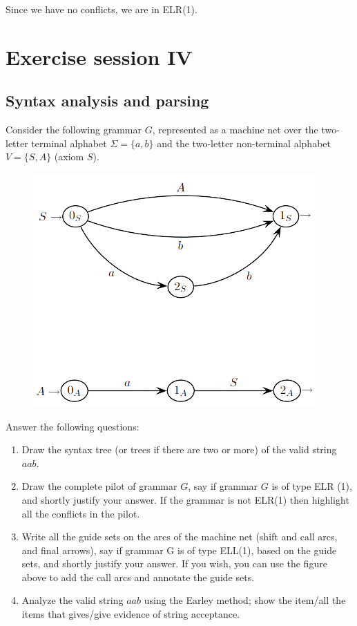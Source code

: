 \documentclass[12pt, a4paper]{report}
\begin{document}
    Since we have no conflicts, we are in ELR(1). 
\newpage 

\chapter{Exercise session IV}
    \section{Syntax analysis and parsing}
        Consider the following grammar $G$, represented as a machine net over the two-letter terminal alphabet $\Sigma = \{ a, b \}$ and the two-letter non-terminal alphabet 
        $V = \{ S, A \}$ (axiom $S$).
        \begin{figure}[H]
            \centering
            \includegraphics[width=0.5\linewidth]{images/parsing.png}
        \end{figure} 
        Answer the following questions:
        \begin{enumerate}
            \item Draw the syntax tree (or trees if there are two or more) of the valid string $a a b$.
            \item Draw the complete pilot of grammar $G$, say if grammar $G$ is of type ELR (1), and shortly justify your answer. If the grammar is not ELR(1) then highlight
                all the conflicts in the pilot.
            \item Write all the guide sets on the arcs of the machine net (shift and call arcs, and final arrows), say if grammar G is of type ELL(1), based on the guide sets, 
                and shortly justify your answer. If you wish, you can use the figure above to add the call arcs and annotate the guide sets.
            \item Analyze the valid string $a a b$ using the Earley method; show the item/all the items that gives/give evidence of string acceptance.
        \end{enumerate}
\end{document}
